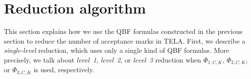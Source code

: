 \documentclass[a4paper,UKenglish,cleveref,autoref,thm-restate]{lipics-v2021}
\newcommand{\rem}{\mathit{nm}}
\def\false{\mathit{false}}
\def\true{\mathit{true}}
\newcommand{\mA}{\mathcal{A}}
\begin{document}

\section{Reduction algorithm}\label{sec:algo}

This section explains how we use the QBF formulas constructed in the
previous section to reduce the number of acceptance marks in TELA.
First, we describe a \emph{single-level} reduction, which
uses only a single kind of QBF formulas. More precisely, we talk about
\emph{level~1}, \emph{level~2}, or \emph{level~3} reduction when
$\Phi_{1,C,K}$, $\Phi_{2,C,K}$, or
$\Phi_{3,C,K}$ is used, respectively.

\end{document}

